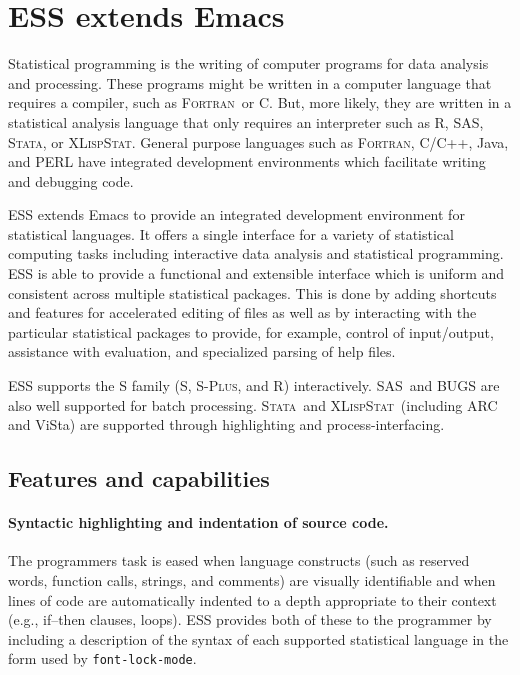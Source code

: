 \documentclass{article}
\newcommand*{\SAS}{\textsc{SAS}}
\newcommand*{\Splus}{\textsc{S-Plus}}
\newcommand*{\XLispStat}{\textsc{XLispStat}}
\newcommand*{\Stata}{\textsc{Stata}}
\newcommand*{\Fortran}{\textsc{Fortran}}
\newcommand{\stexttt}[1]{{\small\texttt{#1}}}
\begin{document}
\section{ESS extends Emacs}
\label{sec:ess-extends-emacs}

Statistical programming is the writing of computer programs for data
analysis and processing.  These programs might be written in a
computer language that requires a compiler, such as \Fortran\ or C.
But, more likely, they are written in a statistical analysis language
that only requires an interpreter such as R, \SAS, \Stata, or \XLispStat.
General purpose languages such as \Fortran, C/C++, Java, and PERL
have integrated development environments which facilitate writing and
debugging code.

ESS extends Emacs to provide an integrated development environment for
statistical languages.  It offers a single
interface for a variety of statistical computing tasks including
interactive data analysis and statistical programming.
ESS is able to provide a functional and extensible interface
which is uniform and consistent across multiple statistical packages.
This is done by adding shortcuts and features for accelerated editing
of files as well as by interacting with the particular statistical
packages to provide, for example, control of input/output, assistance
with evaluation, and specialized parsing of help files.

ESS supports the S family (S, \Splus, and R) interactively.  \SAS\ and
BUGS are also well supported for batch processing.  \Stata\ and
\XLispStat\ (including ARC and ViSta) are supported through
highlighting and process-interfacing.

\subsection{Features and capabilities}
\label{sec:ESS:features}

\paragraph{Syntactic highlighting and indentation of source code.}
The programmers task is eased when language constructs (such as
reserved words, function calls, strings, and comments) are visually
identifiable and when lines of code are automatically indented to a
depth appropriate to their context (e.g., if--then clauses, loops).
ESS provides both of these to the programmer by including a
description of the syntax of each supported statistical language in
the form used by \stexttt{font-lock-mode}.
\end{document}
